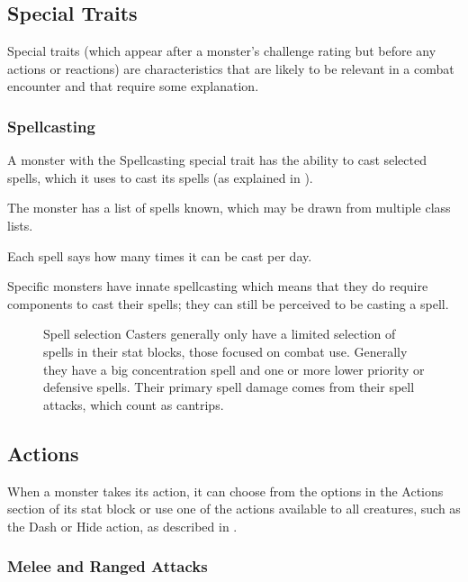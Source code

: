 \subsection{Special Traits}

Special traits (which appear after a monster's challenge rating but before any actions or reactions) are characteristics that are likely to be relevant in a combat encounter and that require some explanation.

\subsubsection{Spellcasting}

A monster with the Spellcasting special trait has the ability to cast selected spells, which it uses to cast its spells (as explained in ).

The monster has a list of spells known, which may be drawn from multiple class lists.

Each spell says how many times it can be cast per day.

Specific monsters have innate spellcasting which means that they do require components to cast their spells; they can still be perceived to be casting a spell.

\begin{figure}
\begin{DndComment}{Spell selection}
    Casters generally only have a limited selection of spells in their stat blocks, those focused on combat use. Generally they have a big concentration spell and one or more lower priority or defensive spells. Their primary spell damage comes from their spell attacks, which count as cantrips. 
\end{DndComment}
\end{figure} 

\subsection{Actions}

When a monster takes its action, it can choose from the options in the Actions section of its stat block or use one of the actions available to all creatures, such as the Dash or Hide action, as described in .

\subsubsection{Melee and Ranged Attacks}


